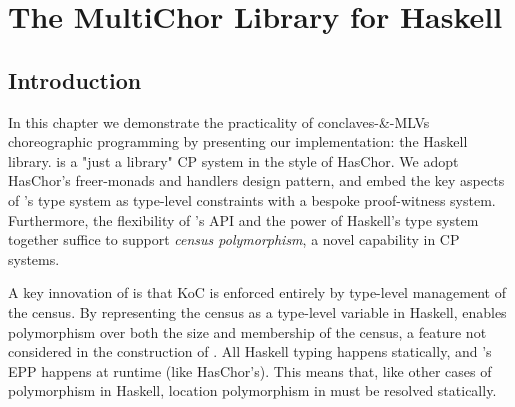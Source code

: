 \chapter{The MultiChor Library for Haskell}
\label{sec:multichor}




\section{Introduction}
In this chapter we demonstrate the practicality of conclaves-\&-MLVs choreographic programming
by presenting our implementation:
the \MultiChor Haskell library.
\MultiChor is a "just a library" CP system in the style of HasChor.
We adopt HasChor's freer-monads and handlers design pattern,
and embed the key aspects of \HLSCentral's type system as type-level constraints with a bespoke proof-witness system.
Furthermore, the flexibility of \MultiChor's API and the power of Haskell's type system together suffice to support \emph{census polymorphism},
a novel capability in CP systems.

A key innovation of \HLSCentral is that KoC is enforced entirely
by type-level management of the census.
By representing the census as a type-level variable in Haskell,
\MultiChor enables polymorphism over both the size and membership of the census,
a feature not considered in the construction of \HLSCentral.
All Haskell typing happens statically, and \MultiChor's EPP happens at runtime (like HasChor's).
This means that, like other cases of polymorphism in Haskell, location polymorphism in \MultiChor must be resolved statically.

